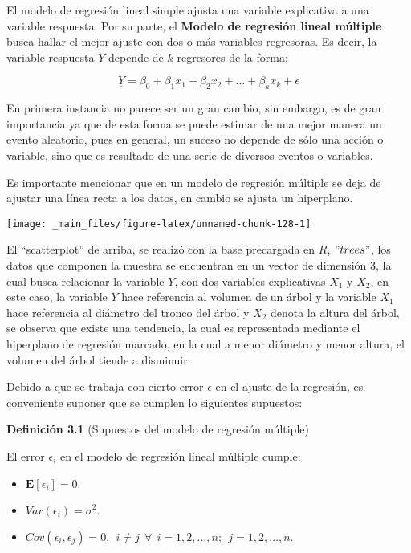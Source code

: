 \documentclass[
  a4paper,
  oneside,
  openany]{book}
\begin{document}
El modelo de regresión lineal simple ajusta una variable explicativa a una variable respuesta; Por su parte, el \textbf{Modelo de regresión lineal múltiple} busca hallar el mejor ajuste con dos o más variables regresoras. Es decir, la variable respuesta \(\underline{Y}\) depende de \(k\) regresores de la forma:

\[
\underline{Y}=\beta_{0}+\beta_{1}x_{1}+\beta_{2}x_{2}+ \ldots +\beta_{k}x_{k}+\epsilon
\]

En primera instancia no parece ser un gran cambio, sin embargo, es de gran importancia ya que de esta forma se puede estimar de una mejor manera un evento aleatorio, pues en general, un suceso no depende de sólo una acción o variable, sino que es resultado de una serie de diversos eventos o variables.

Es importante mencionar que en un modelo de regresión múltiple se deja de ajustar una línea recta a los datos, en cambio se ajusta un hiperplano.

\begin{center}\texttt{[image: \_main\_files/figure-latex/unnamed-chunk-128-1]} \end{center}

El ``scatterplot'' de arriba, se realizó con la base precargada en \(R\), \("trees"\), los datos que componen la muestra se encuentran en un vector de dimensión 3, la cual busca relacionar la variable \(\underline{Y}\), con dos variables explicativas \(X_{1}\) y \(X_{2}\), en este caso, la variable \(\underline{Y}\) hace referencia al volumen de un árbol y la variable \(X_{1}\) hace referencia al diámetro del tronco del árbol y \(X_{2}\) denota la altura del árbol, se observa que existe una tendencia, la cual es representada mediante el hiperplano de regresión marcado, en la cual a menor diámetro y menor altura, el volumen del árbol tiende a disminuir.

Debido a que se trabaja con cierto error \(\epsilon\) en el ajuste de la regresión, es conveniente suponer que se cumplen lo siguientes supuestos:

\textbf{Definición 3.1} (Supuestos del modelo de regresión múltiple)

El error \(\epsilon_{i}\) en el modelo de regresión lineal múltiple cumple:

\begin{itemize}
\item
  \(\mathbf{E}[\epsilon_{i}]=0.\)
\item
  \(Var(\epsilon_{i})=\sigma^2.\)
\item
  \(Cov(\epsilon_{i},\epsilon_{j})=0, \ \ i \neq j \ \ \forall \ \ i= 1,2,\ldots,n; \ \ j= 1,2,\ldots,n.\)
\end{itemize}
\end{document}
